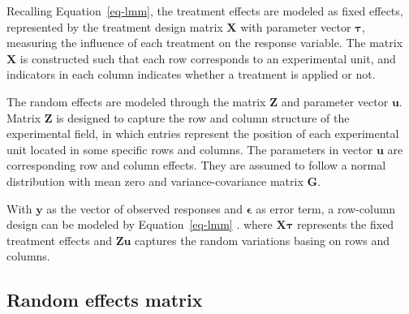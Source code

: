 \documentclass[
  a4paper,
  oneside,
  openany,
  12pt,
  onecolumn]{book}
\theoremstyle{plain}
\theoremstyle{definition}
\theoremstyle{remark}
\begin{document}
Recalling Equation~\ref{eq-lmm}, the treatment effects are modeled as
fixed effects, represented by the treatment design matrix
\(\boldsymbol{X}\) with parameter vector \(\boldsymbol{\tau}\),
measuring the influence of each treatment on the response variable. The
matrix \(\boldsymbol{X}\) is constructed such that each row corresponds
to an experimental unit, and indicators in each column indicates whether
a treatment is applied or not.

The random effects are modeled through the matrix \(\boldsymbol{Z}\) and
parameter vector \(\boldsymbol{u}\). Matrix \(\boldsymbol{Z}\) is
designed to capture the row and column structure of the experimental
field, in which entries represent the position of each experimental unit
located in some specific rows and columns. The parameters in vector
\(\boldsymbol{u}\) are corresponding row and column effects. They are
assumed to follow a normal distribution with mean zero and
variance-covariance matrix \(\boldsymbol{G}\).

With \(\boldsymbol{y}\) as the vector of observed responses and
\(\boldsymbol{\epsilon}\) as error term, a row-column design can be
modeled by Equation~\ref{eq-lmm} . where \(\boldsymbol{X\tau}\)
represents the fixed treatment effects and \(\boldsymbol{Zu}\) captures
the random variations basing on rows and columns.

\subsection{Random effects matrix}\label{random-effects-matrix}
\end{document}
